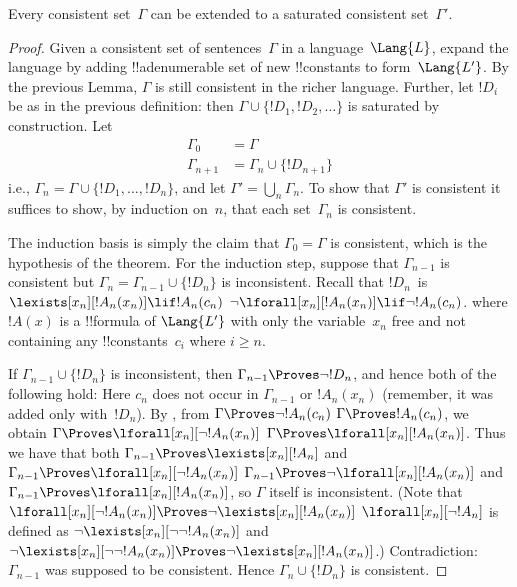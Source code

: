 \documentclass[../../include/open-logic-section]{subfiles}
\begin{document}
\begin{thm}
Every consistent set~$\Gamma$ can be extended to a saturated
consistent set~$\Gamma'$.
\end{thm}

\begin{proof}
Given a consistent set of sentences~$\Gamma$ in a language~$\Lang{L}$,
expand the language by adding !!a{denumerable} set of new
!!{constant}s to form~$\Lang{L'}$.  By the previous Lemma, $\Gamma$ is still
consistent in the richer language.  Further, let $!D_i$ be as in the
previous definition: then $\Gamma \cup \{!D_1, !D_2, \dots\}$ is
saturated by construction.  Let
\begin{align*}
\Gamma_0 & = \Gamma \\
\Gamma_{n+1} & = \Gamma_n \cup \{!D_{n+1} \}
\end{align*}
i.e., $\Gamma_n = \Gamma \cup \{ !D_1, \dots, !D_n \}$, and let
$\Gamma' = \bigcup_{n} \Gamma_n$.  To show that $\Gamma'$ is
consistent it suffices to show, by induction on~$n$, that each
set~$\Gamma_n$ is consistent.

The induction basis is simply the claim that $\Gamma_0 = \Gamma$ is
consistent, which is the hypothesis of the theorem.  For the induction
step, suppose that $\Gamma_{n-1}$ is consistent but $\Gamma_n =
\Gamma_{n-1} \cup \{!D_n\}$ is inconsistent.  Recall that $!D_n$~is
{$\lexists[x_{n}][!A_{n}(x_n)] \lif !A_{n}(c_{n})$}
{$\lnot\lforall[x_{n}][!A_{n}(x_n)] \lif \lnot !A_{n}(c_{n})$}.
where $!A(x)$ is a !!{formula} of $\Lang{L'}$ with only the
variable~$x_n$ free and not containing any !!{constant}s~$c_i$ where
$i \ge n$.

If $\Gamma_{n-1} \cup \{!D_n\}$ is inconsistent, then $\Gamma_{n-1}
\Proves \lnot !D_n$, and hence both of the following hold:
Here $c_n$ does not occur in $\Gamma_{n-1}$ or $!A_n(x_n)$ (remember,
it was added only with~$!D_n$).  By
,
from 
{$\Gamma \Proves \lnot !A_n(c_n)$}
{$\Gamma \Proves !A_n(c_n)$},
we obtain
{$\Gamma \Proves \lforall[x_n][\lnot !A_n(x_n)]$}
{$\Gamma \Proves \lforall[x_n][!A_n(x_n)]$}.
Thus we have that both
{$\Gamma_{n-1} \Proves \lexists[x_n][!A_n]$ and
$\Gamma_{n-1} \Proves \lforall[x_n][\lnot !A_n(x_n)]$}
{$\Gamma_{n-1} \Proves \lnot\lforall[x_n][!A_n(x_n)]$ and
$\Gamma_{n-1} \Proves \lforall[x_n][!A_n(x_n)]$},
so $\Gamma$ itself is inconsistent.
{(Note that
{$\lforall[x_n][\lnot !A_n(x_n)] \Proves
  \lnot\lexists[x_n][!A_n(x_n)]$}
{$\lforall[x_n][\lnot !A_n]$ is defined as
  $\lnot\lexists[x_n][\lnot\lnot !A_n(x_n)]$ and
  $\lnot\lexists[x_n][\lnot\lnot !A_n(x_n)] \Proves
  \lnot\lexists[x_n][!A_n(x_n)]$}.)}{}
Contradiction: $\Gamma_{n-1}$ was supposed to be consistent.  Hence
$\Gamma_n \cup \{ !D_n\}$ is consistent.
\end{proof}
\end{document}
